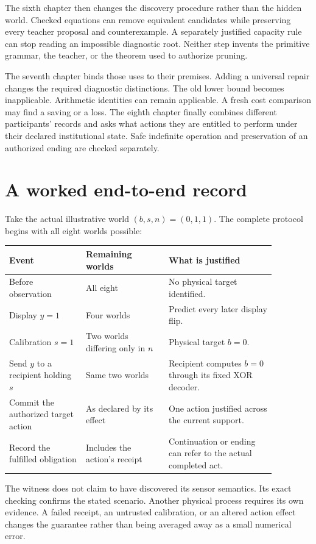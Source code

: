 The sixth chapter then changes the discovery procedure rather than the hidden world. Checked equations can remove equivalent candidates while preserving every teacher proposal and counterexample. A separately justified capacity rule can stop reading an impossible diagnostic root. Neither step invents the primitive grammar, the teacher, or the theorem used to authorize pruning.

The seventh chapter binds those uses to their premises. Adding a universal repair changes the required diagnostic distinctions. The old lower bound becomes inapplicable. Arithmetic identities can remain applicable. A fresh cost comparison may find a saving or a loss. The eighth chapter finally combines different participants' records and asks what actions they are entitled to perform under their declared institutional state. Safe indefinite operation and preservation of an authorized ending are checked separately.

\section{A worked end-to-end record}
Take the actual illustrative world $(b,s,n)=(0,1,1)$. The complete protocol begins with all eight worlds possible:
\begin{center}\begin{tabular}{p{0.25\linewidth}p{0.27\linewidth}p{0.35\linewidth}}\toprule
Event & Remaining worlds & What is justified\\\midrule
Before observation & All eight & No physical target identified.\\
Display $y=1$ & Four worlds & Predict every later display flip.\\
Calibration $s=1$ & Two worlds differing only in $n$ & Physical target $b=0$.\\
Send $y$ to a recipient holding $s$ & Same two worlds & Recipient computes $b=0$ through its fixed XOR decoder.\\
Commit the authorized target action & As declared by its effect & One action justified across the current support.\\
Record the fulfilled obligation & Includes the action's receipt & Continuation or ending can refer to the actual completed act.\\\bottomrule\end{tabular}\end{center}

The witness does not claim to have discovered its sensor semantics. Its exact checking confirms the stated scenario. Another physical process requires its own evidence. A failed receipt, an untrusted calibration, or an altered action effect changes the guarantee rather than being averaged away as a small numerical error.

